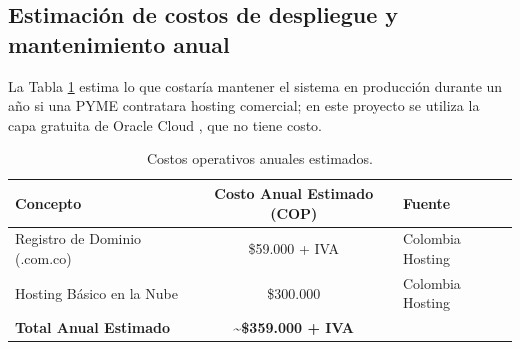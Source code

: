 \subsection*{Estimación de costos de despliegue y mantenimiento anual}
\label{sec:costo_despliegue}

La Tabla \ref{tab:costo_operativo} estima lo que costaría mantener el sistema en producción durante un año si una PYME contratara hosting comercial; en este proyecto se utiliza la capa gratuita de Oracle Cloud \cite{oci_always_free}, que no tiene costo.

\begin{table}[!htbp]
\centering
\caption{Costos operativos anuales estimados.}
\label{tab:costo_operativo}
\begin{tabular}{|l|c|l|}
\hline
\textbf{Concepto} & \textbf{Costo Anual Estimado (COP)} & \textbf{Fuente} \\ \hline
Registro de Dominio (.com.co) & \$59.000 + IVA & Colombia Hosting \cite{colhost_dominios} \\ 
Hosting Básico en la Nube & \$300.000 & Colombia Hosting \cite{colhost_hosting} \\ \hline
\textbf{Total Anual Estimado} & \textbf{\textasciitilde\$359.000 + IVA} & \\ \hline
\end{tabular}
\end{table}


